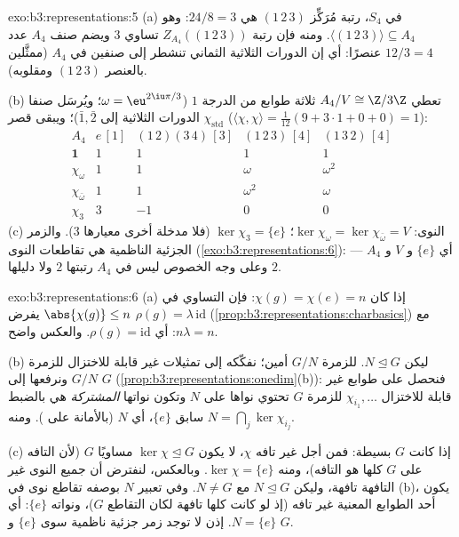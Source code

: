 \begin{solution}{exo:b3:representations:5}
(a) في $S_4$، رتبة مُرَكِّز $(1\,2\,3)$ هي $24/8 =
3$: وهو $\langle(1\,2\,3)\rangle \subseteq A_4$.
ومنه فإن رتبة $Z_{A_4}((1\,2\,3))$ تساوي $3$ ويضم صنف $A_4$ عدد $12/3
= 4$ عنصرًا:
أي إن الدورات الثلاثية الثماني تنشطر إلى صنفين في $A_4$
(ممثَّلين بالعنصر $(1\,2\,3)$ ومقلوبه).

(b) تعطي $A_4/V \cong \Z/3\Z$ ثلاثة طوابع من الدرجة $1$ ($\omega = \eu^{2\iu\pi/3}$؛ ويُرسَل صنفا
الدورات الثلاثية إلى $\bar1, \bar2$)؛ ويبقى قصر $\chi_{\mathrm{std}}$  ($\langle\chi,\chi\rangle = \frac1{12}(9 + 3
\cdot 1 + 0 + 0) = 1$):
\[
\begin{array}{c|cccc}
A_4 & e\,[1] & (1\,2)(3\,4)\,[3] & (1\,2\,3)\,[4] &
(1\,3\,2)\,[4]\\
\hline
\mathbf 1 & 1 & 1 & 1 & 1\\
\chi_\omega & 1 & 1 & \omega & \omega^2\\
\chi_{\bar\omega} & 1 & 1 & \omega^2 & \omega\\
\chi_3 & 3 & -1 & 0 & 0
\end{array}
\]
(c) النوى: $\ker\chi_\omega = \ker\chi_{\bar\omega} = V$؛ $\ker\chi_3 = \{e\}$ (فلا مدخلة أخرى معيارها $3$). والزمر
الجزئية الناظمية هي تقاطعات النوى (\cref{exo:b3:representations:6}): أي $\{e\}$
و $V$ و $A_4$ --- وعلى وجه الخصوص ليس في $A_4$ 
رتبتها $2$ ولا دليلها $2$.
\end{solution}

\begin{solution}{exo:b3:representations:6}
(a) إذا كان $\chi(g) = \chi(e) = n$: فإن التساوي في $\abs{\chi(g)} \leq n$ يفرض $\rho(g) = \lambda\,\mathrm{id}$
(\cref{prop:b3:representations:charbasics}) مع $n\lambda = n$: أي $\rho(g) = \mathrm{id}$. والعكس واضح.

(b) ليكن $N \trianglelefteq G$.  للزمرة $G/N$ أمين؛ نفكّكه إلى
تمثيلات غير قابلة للاختزال للزمرة $G/N$ ونرفعها إلى $G$
(\cref{prop:b3:representations:onedim}(b)): فنحصل على طوابع غير قابلة للاختزال $\chi_{i_1}, \dots$
للزمرة $G$ تحتوي نواها على $N$ وتكون نواتها \emph{المشتركة} هي
بالضبط سابق $\{e\}$، أي $N$ (بالأمانة على ). ومنه
$N = \bigcap_j \ker\chi_{i_j}$.

(c) إذا كانت $G$ بسيطة: فمن أجل  غير تافه  $\chi$، لا يكون $\ker\chi \trianglelefteq G$ مساويًا $G$ (لأن  التافه على $G$ كلها هو  التافه)، ومنه
$\ker\chi = \{e\}$. وبالعكس، لنفترض أن جميع النوى غير التافهة تافهة، وليكن
$N \trianglelefteq G$ مع $N \neq
G$. وفي تعبير $N$ بوصفه تقاطع نوى في (b)، يكون
أحد الطوابع المعنية غير تافه (إذ لو كانت كلها تافهة لكان
التقاطع $G$)، ونواته $\{e\}$: أي $N =
\{e\}$. إذن لا توجد زمر جزئية
ناظمية سوى $\{e\}$ و $G$.
\end{solution}

